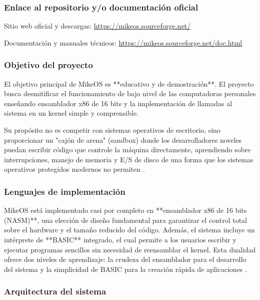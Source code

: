 \subsubsection{Enlace al repositorio y/o documentación oficial}

Sitio web oficial y descargas:  
\url{https://mikeos.sourceforge.net/} \cite{mikeos_about}

Documentación y manuales técnicos:  
\url{https://mikeos.sourceforge.net/doc.html} \cite{mikeos_purpose}

\subsubsection{Objetivo del proyecto}

El objetivo principal de MikeOS es **educativo y de demostración**. El proyecto busca desmitificar el funcionamiento de bajo nivel de las computadoras personales enseñando ensamblador x86 de 16 bits y la implementación de llamadas al sistema en un kernel simple y comprensible.

Su propósito no es competir con sistemas operativos de escritorio, sino proporcionar un "cajón de arena" (sandbox) donde los desarrolladores noveles puedan escribir código que controle la máquina directamente, aprendiendo sobre interrupciones, manejo de memoria y E/S de disco de una forma que los sistemas operativos protegidos modernos no permiten \cite{mikeos_purpose}.

\subsubsection{Lenguajes de implementación}

MikeOS está implementado casi por completo en **ensamblador x86 de 16 bits (NASM)**, una elección de diseño fundamental para garantizar el control total sobre el hardware y el tamaño reducido del código. Además, el sistema incluye un intérprete de **BASIC** integrado, el cual permite a los usuarios escribir y ejecutar programas sencillos sin necesidad de reensamblar el kernel. Esta dualidad ofrece dos niveles de aprendizaje: la crudeza del ensamblador para el desarrollo del sistema y la simplicidad de BASIC para la creación rápida de aplicaciones \cite{mikeos_about, mikeos_purpose}.

\subsubsection{Arquitectura del sistema}

